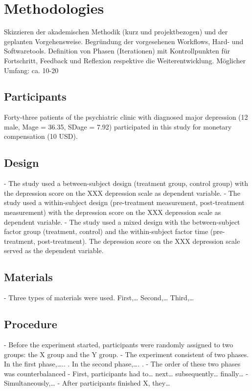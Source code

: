 \chapter{Methodologies}

Skizzieren der akademischen Methodik (kurz und projektbezogen) und der geplanten Vorgehensweise. Begründung der vorgesehenen Workflows, Hard- und Softwaretools. Definition von Phasen (Iterationen) mit Kontrollpunkten für Fortschritt, Feedback und Reflexion respektive die Weiterentwicklung. Möglicher Umfang: ca. 10-20%

\section{Participants}
\label{participants}

Forty-three patients of the psychiatric clinic with diagnosed major depression (12 male, Mage = 36.35, SDage = 7.92) participated in this study for monetary compensation (10 USD).

\section{Design}
\label{design}

- The study used a between-subject design (treatment group, control group) with the
depression score on the XXX depression scale as dependent variable.
- The study used a within-subject design (pre-treatment measurement, post-treatment
measurement) with the depression score on the XXX depression scale as dependent variable.
- The study used a mixed design with the between-subject factor group (treatment, control) and the within-subject factor time (pre-treatment, post-treatment). The depression score on the XXX depression scale served as the dependent variable.

\section{Materials}
\label{materials}

- Three types of materials were used. First,… Second,… Third,…

\section{Procedure}
\label{procedure}

- Before the experiment started, participants were randomly assigned to two groups: the X group and the Y group.
- The experiment consistent of two phases. In the first phase,….. . In the second phase,…. .
- The order of these two phases was counterbalanced
- First, participants had to… next… subsequently… finally…
- Simultaneously,…
- After participants finished X, they… \citep{swan_future_2016} %

